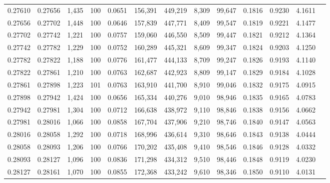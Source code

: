 \begin{tabular}{rrrrrrrrrrrrr}
0.27610 & 0.27656 & 1,435 & 100 &                                     0.0651 & 156,391 & 449,219 &   8,309 &  99,647 & 0.1816 & 0.9230 & 4.1611 \\
0.27656 & 0.27702 & 1,448 & 100 &                                     0.0646 & 157,839 & 447,771 &   8,409 &  99,547 & 0.1819 & 0.9221 & 4.1477 \\
0.27702 & 0.27742 & 1,221 & 100 &                                     0.0757 & 159,060 & 446,550 &   8,509 &  99,447 & 0.1821 & 0.9212 & 4.1364 \\
0.27742 & 0.27782 & 1,229 & 100 &                                     0.0752 & 160,289 & 445,321 &   8,609 &  99,347 & 0.1824 & 0.9203 & 4.1250 \\
0.27782 & 0.27822 & 1,188 & 100 &                                     0.0776 & 161,477 & 444,133 &   8,709 &  99,247 & 0.1826 & 0.9193 & 4.1140 \\
0.27822 & 0.27861 & 1,210 & 100 &                                     0.0763 & 162,687 & 442,923 &   8,809 &  99,147 & 0.1829 & 0.9184 & 4.1028 \\
0.27861 & 0.27898 & 1,223 & 101 &                                     0.0763 & 163,910 & 441,700 &   8,910 &  99,046 & 0.1832 & 0.9175 & 4.0915 \\
0.27898 & 0.27942 & 1,424 & 100 &                                     0.0656 & 165,334 & 440,276 &   9,010 &  98,946 & 0.1835 & 0.9165 & 4.0783 \\
0.27942 & 0.27981 & 1,304 & 100 &                                     0.0712 & 166,638 & 438,972 &   9,110 &  98,846 & 0.1838 & 0.9156 & 4.0662 \\
0.27981 & 0.28016 & 1,066 & 100 &                                     0.0858 & 167,704 & 437,906 &   9,210 &  98,746 & 0.1840 & 0.9147 & 4.0563 \\
0.28016 & 0.28058 & 1,292 & 100 &                                     0.0718 & 168,996 & 436,614 &   9,310 &  98,646 & 0.1843 & 0.9138 & 4.0444 \\
0.28058 & 0.28093 & 1,206 & 100 &                                     0.0766 & 170,202 & 435,408 &   9,410 &  98,546 & 0.1846 & 0.9128 & 4.0332 \\
0.28093 & 0.28127 & 1,096 & 100 &                                     0.0836 & 171,298 & 434,312 &   9,510 &  98,446 & 0.1848 & 0.9119 & 4.0230 \\
0.28127 & 0.28161 & 1,070 & 100 &                                     0.0855 & 172,368 & 433,242 &   9,610 &  98,346 & 0.1850 & 0.9110 & 4.0131 \\

\end{tabular}
